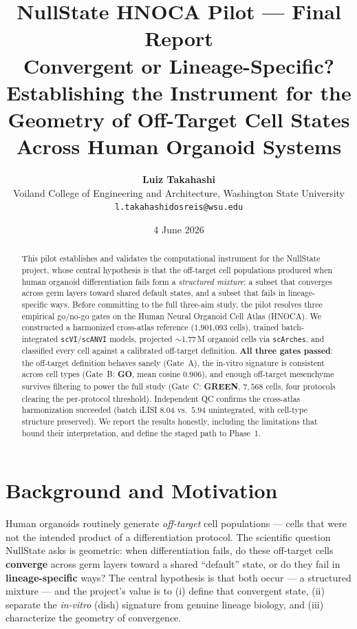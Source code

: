 \documentclass[11pt]{article}
\title{\vspace{-1.5em}\textbf{\color{nsblue}NullState HNOCA Pilot --- Final Report}\\[0.3em]
\large Convergent or Lineage-Specific? Establishing the Instrument for the\\
Geometry of Off-Target Cell States Across Human Organoid Systems}
\author{\textbf{Luiz Takahashi}\\[0.25em]
\normalsize Voiland College of Engineering and Architecture, Washington State University\\
\normalsize \texttt{l.takahashidosreis@wsu.edu}}
\date{4 June 2026}
\newcommand{\GO}{\textcolor{nsgreen}{\textbf{GO}}}
\newcommand{\GREEN}{\textcolor{nsgreen}{\textbf{GREEN}}}
\begin{document}
\maketitle
\vspace{-1.5em}

\begin{abstract}
\noindent This pilot establishes and validates the computational instrument for the NullState project, whose central hypothesis is that the off-target cell populations produced when human organoid differentiation fails form a \emph{structured mixture}: a subset that converges across germ layers toward shared default states, and a subset that fails in lineage-specific ways. Before committing to the full three-aim study, the pilot resolves three empirical go/no-go gates on the Human Neural Organoid Cell Atlas (HNOCA). We constructed a harmonized cross-atlas reference (1{,}901{,}093 cells), trained batch-integrated \texttt{scVI}/\texttt{scANVI} models, projected $\sim$1.77\,M organoid cells via \texttt{scArches}, and classified every cell against a calibrated off-target definition. \textbf{All three gates passed}: the off-target definition behaves sanely (Gate~A), the in-vitro signature is consistent across cell types (Gate~B: \GO, mean cosine $0.906$), and enough off-target mesenchyme survives filtering to power the full study (Gate~C: \GREEN, $7{,}568$ cells, four protocols clearing the per-protocol threshold). Independent QC confirms the cross-atlas harmonization succeeded (batch iLISI $8.04$ vs.\ $5.94$ unintegrated, with cell-type structure preserved). We report the results honestly, including the limitations that bound their interpretation, and define the staged path to Phase~1.
\end{abstract}

\section{Background and Motivation}
Human organoids routinely generate \emph{off-target} cell populations --- cells that were not the intended product of a differentiation protocol. The scientific question NullState asks is geometric: when differentiation fails, do these off-target cells \textbf{converge} across germ layers toward a shared ``default'' state, or do they fail in \textbf{lineage-specific} ways? The central hypothesis is that both occur --- a structured mixture --- and the project's value is to (i) define that convergent state, (ii) separate the \emph{in-vitro} (dish) signature from genuine lineage biology, and (iii) characterize the geometry of convergence.
\end{document}
